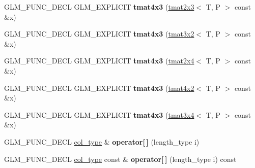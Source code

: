 \begin{DoxyCompactItemize}
\item 
\mbox{\label{structglm_1_1tmat4x3_ac73e3e89eac9d9d6b6f8dbb49f55a0e2}} 
G\+L\+M\+\_\+\+F\+U\+N\+C\+\_\+\+D\+E\+CL G\+L\+M\+\_\+\+E\+X\+P\+L\+I\+C\+IT {\bfseries tmat4x3} (\hyperlink{structglm_1_1tmat2x3}{tmat2x3}$<$ T, P $>$ const \&x)
\item 
\mbox{\label{structglm_1_1tmat4x3_a125210f891f2b11559d36ea49cbb66ba}} 
G\+L\+M\+\_\+\+F\+U\+N\+C\+\_\+\+D\+E\+CL G\+L\+M\+\_\+\+E\+X\+P\+L\+I\+C\+IT {\bfseries tmat4x3} (\hyperlink{structglm_1_1tmat3x2}{tmat3x2}$<$ T, P $>$ const \&x)
\item 
\mbox{\label{structglm_1_1tmat4x3_a7c76da17513ed772c8b7ebf778fd881f}} 
G\+L\+M\+\_\+\+F\+U\+N\+C\+\_\+\+D\+E\+CL G\+L\+M\+\_\+\+E\+X\+P\+L\+I\+C\+IT {\bfseries tmat4x3} (\hyperlink{structglm_1_1tmat2x4}{tmat2x4}$<$ T, P $>$ const \&x)
\item 
\mbox{\label{structglm_1_1tmat4x3_adfbc5c5490e4bd2606d1c20fd76cd3b2}} 
G\+L\+M\+\_\+\+F\+U\+N\+C\+\_\+\+D\+E\+CL G\+L\+M\+\_\+\+E\+X\+P\+L\+I\+C\+IT {\bfseries tmat4x3} (\hyperlink{structglm_1_1tmat4x2}{tmat4x2}$<$ T, P $>$ const \&x)
\item 
\mbox{\label{structglm_1_1tmat4x3_a61edf2edf20cb9f6b6a977aa041d5f19}} 
G\+L\+M\+\_\+\+F\+U\+N\+C\+\_\+\+D\+E\+CL G\+L\+M\+\_\+\+E\+X\+P\+L\+I\+C\+IT {\bfseries tmat4x3} (\hyperlink{structglm_1_1tmat3x4}{tmat3x4}$<$ T, P $>$ const \&x)
\item 
\mbox{\label{structglm_1_1tmat4x3_a079c5c89aa4fb8235e738b1b4db13fc3}} 
G\+L\+M\+\_\+\+F\+U\+N\+C\+\_\+\+D\+E\+CL \hyperlink{structglm_1_1tvec3}{col\+\_\+type} \& {\bfseries operator\mbox{[}$\,$\mbox{]}} (length\+\_\+type i)
\item 
\mbox{\label{structglm_1_1tmat4x3_a7068a5dce773217a0bc7b44558790285}} 
G\+L\+M\+\_\+\+F\+U\+N\+C\+\_\+\+D\+E\+CL \hyperlink{structglm_1_1tvec3}{col\+\_\+type} const  \& {\bfseries operator\mbox{[}$\,$\mbox{]}} (length\+\_\+type i) const
\item 
\mbox{\label{structglm_1_1tmat4x3_aec1ec9625bd7a013f5349c873a5040a9}} 

\end{DoxyCompactItemize}
